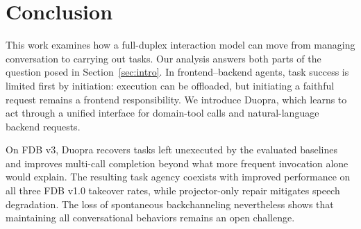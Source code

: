 \section{Conclusion}
\label{sec:conclusion}

This work examines how a full-duplex interaction model can move from managing conversation to carrying out tasks. Our analysis answers both parts of the question posed in Section~\ref{sec:intro}. In frontend--backend agents, task success is limited first by initiation: execution can be offloaded, but initiating a faithful request remains a frontend responsibility. We introduce Duopra, which learns to act through a unified interface for domain-tool calls and natural-language backend requests.

On FDB v3, Duopra recovers tasks left unexecuted by the evaluated baselines and improves multi-call completion beyond what more frequent invocation alone would explain. The resulting task agency coexists with improved performance on all three FDB v1.0 takeover rates, while projector-only repair mitigates speech degradation.
The loss of spontaneous backchanneling nevertheless shows that maintaining all conversational behaviors remains an open challenge.
